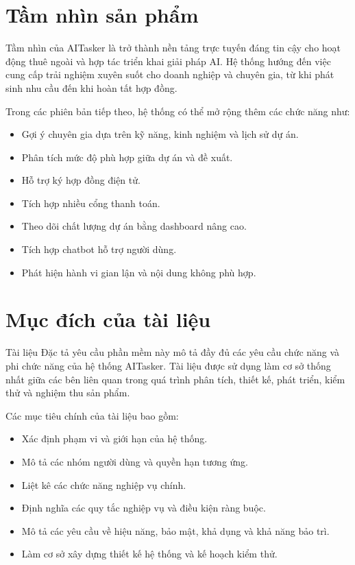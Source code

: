 \section{Tầm nhìn sản phẩm}
\label{sec:product-vision}

Tầm nhìn của AITasker là trở thành nền tảng trực tuyến đáng tin cậy cho hoạt động thuê ngoài và hợp tác triển khai giải pháp AI. Hệ thống hướng đến việc cung cấp trải nghiệm xuyên suốt cho doanh nghiệp và chuyên gia, từ khi phát sinh nhu cầu đến khi hoàn tất hợp đồng.

Trong các phiên bản tiếp theo, hệ thống có thể mở rộng thêm các chức năng như:

\begin{itemize}
    \item Gợi ý chuyên gia dựa trên kỹ năng, kinh nghiệm và lịch sử dự án.
    \item Phân tích mức độ phù hợp giữa dự án và đề xuất.
    \item Hỗ trợ ký hợp đồng điện tử.
    \item Tích hợp nhiều cổng thanh toán.
    \item Theo dõi chất lượng dự án bằng dashboard nâng cao.
    \item Tích hợp chatbot hỗ trợ người dùng.
    \item Phát hiện hành vi gian lận và nội dung không phù hợp.
\end{itemize}

\section{Mục đích của tài liệu}
\label{sec:document-purpose}

Tài liệu Đặc tả yêu cầu phần mềm này mô tả đầy đủ các yêu cầu chức năng và phi chức năng của hệ thống AITasker. Tài liệu được sử dụng làm cơ sở thống nhất giữa các bên liên quan trong quá trình phân tích, thiết kế, phát triển, kiểm thử và nghiệm thu sản phẩm.

Các mục tiêu chính của tài liệu bao gồm:

\begin{itemize}
    \item Xác định phạm vi và giới hạn của hệ thống.
    \item Mô tả các nhóm người dùng và quyền hạn tương ứng.
    \item Liệt kê các chức năng nghiệp vụ chính.
    \item Định nghĩa các quy tắc nghiệp vụ và điều kiện ràng buộc.
    \item Mô tả các yêu cầu về hiệu năng, bảo mật, khả dụng và khả năng bảo trì.
    \item Làm cơ sở xây dựng thiết kế hệ thống và kế hoạch kiểm thử.
\end{itemize}

